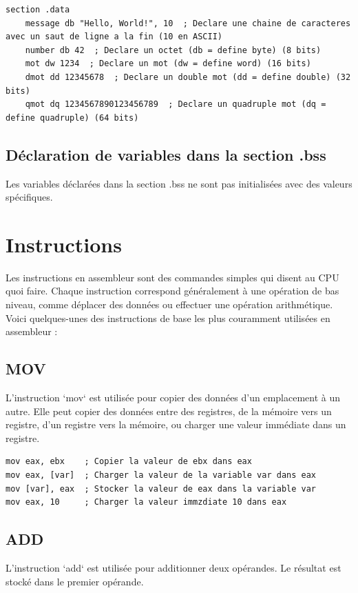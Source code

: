 \documentclass[a4paper, 12pt]{report}
\begin{document}
\begin{lstlisting}[language={[x86masm]Assembler}]
  section .data
    message db "Hello, World!", 10  ; Declare une chaine de caracteres avec un saut de ligne a la fin (10 en ASCII)
    number db 42  ; Declare un octet (db = define byte) (8 bits)
    mot dw 1234  ; Declare un mot (dw = define word) (16 bits)
    dmot dd 12345678  ; Declare un double mot (dd = define double) (32 bits)
    qmot dq 1234567890123456789  ; Declare un quadruple mot (dq = define quadruple) (64 bits)
\end{lstlisting}

\subsection{Déclaration de variables dans la section .bss}
Les variables déclarées dans la section .bss ne sont pas initialisées avec des valeurs spécifiques.

\section{Instructions}
Les instructions en assembleur sont des commandes simples qui disent au CPU quoi faire. Chaque instruction correspond généralement à une opération de bas niveau, comme déplacer des données ou effectuer une opération arithmétique. Voici quelques-unes des instructions de base les plus couramment utilisées en assembleur \cite{2}:

\subsection{MOV}
L'instruction `mov` est utilisée pour copier des données d'un emplacement à un autre. Elle peut copier des données entre des registres, de la mémoire vers un registre, d'un registre vers la mémoire, ou charger une valeur immédiate dans un registre.

\begin{lstlisting}[language={[x86masm]Assembler}]
mov eax, ebx    ; Copier la valeur de ebx dans eax
mov eax, [var]  ; Charger la valeur de la variable var dans eax
mov [var], eax  ; Stocker la valeur de eax dans la variable var
mov eax, 10     ; Charger la valeur immzdiate 10 dans eax
\end{lstlisting}

\break\subsection{ADD}
L'instruction `add` est utilisée pour additionner deux opérandes. Le résultat est stocké dans le premier opérande.
\end{document}

